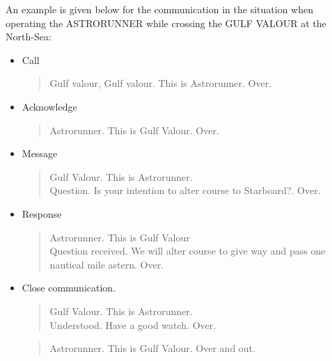 An example is given below for the communication in the situation when operating the ASTRORUNNER while crossing the GULF VALOUR at the North-Sea:
\begin{spacing}{1}
	\begin{itemize}
		\item Call
		\begin{quote}
			Gulf valour, Gulf valour. This is Astrorunner. Over.
		\end{quote}
		\item Acknowledge
		\begin{quote}
			Astrorunner. This is Gulf Valour. Over.
		\end{quote}
		\item Message
		\begin{quote}
			Gulf Valour. This is Astrorunner. \\
			Question. Is your intention to alter course to Starboard?. Over.
		\end{quote}
		\item Response
		\begin{quote}
			Astrorunner. This is Gulf Valour \\
			Question received. We will alter course to give way and pass one nautical mile astern. Over.
		\end{quote}
		\item Close communication.
		\begin{quote}
			Gulf Valour. This is Astrorunner.\\
			Understood. Have a good watch. Over.
		\end{quote}
		\begin{quote}
			Astrorunner. This is Gulf Valour. Over and out.
		\end{quote}
	\end{itemize}
\end{spacing}

